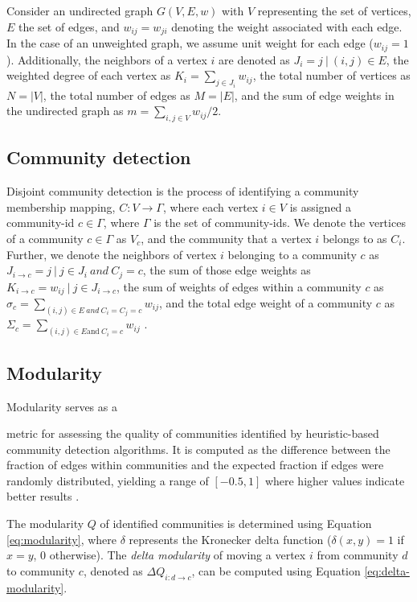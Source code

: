 Consider an undirected graph $G(V, E, w)$ with $V$ representing the set of vertices, $E$ the set of edges, and $w_{ij} = w_{ji}$ denoting the weight associated with each edge. In the case of an unweighted graph, we assume unit weight for each edge ($w_{ij} = 1$). Additionally, the neighbors of a vertex $i$ are denoted as $J_i = {j\ |\ (i, j) \in E}$, the weighted degree of each vertex as $K_i = \sum_{j \in J_i} w_{ij}$, the total number of vertices as $N = |V|$, the total number of edges as $M = |E|$, and the sum of edge weights in the undirected graph as $m = \sum_{i, j \in V} w_{ij}/2$.




\subsection{Community detection}

Disjoint community detection is the process of identifying a community membership mapping, $C: V \rightarrow \Gamma$, where each vertex $i \in V$ is assigned a community-id $c \in \Gamma$, where $\Gamma$ is the set of community-ids. We denote the vertices of a community $c \in \Gamma$ as $V_c$, and the community that a vertex $i$ belongs to as $C_i$. Further, we denote the neighbors of vertex $i$ belonging to a community $c$ as $J_{i \rightarrow c} = {j\ |\ j \in J_i\ and\ C_j = c}$, the sum of those edge weights as $K_{i \rightarrow c} = {w_{ij}\ |\ j \in J_{i \rightarrow c}}$, the sum of weights of edges within a community $c$ as $\sigma_c = \sum_{(i, j) \in E\ and\ C_i = C_j = c} w_{ij}$, and the total edge weight of a community $c$ as $\Sigma_c = \sum_{(i, j) \in E \mbox{and}\ C_i = c} w_{ij}$ \cite{com-zarayeneh21, com-leskovec21}.




\subsection{Modularity}

Modularity serves as a metric for assessing the quality of communities identified by heuristic-based community detection algorithms. It is computed as the difference between the fraction of edges within communities and the expected fraction if edges were randomly distributed, yielding a range of $[-0.5, 1]$ where higher values indicate better results \cite{com-brandes07}. The modularity $Q$ of identified communities is determined using Equation \ref{eq:modularity}, where $\delta$ represents the Kronecker delta function ($\delta (x,y)=1$ if $x=y$, $0$ otherwise). The \textit{delta modularity} of moving a vertex $i$ from community $d$ to community $c$, denoted as $\Delta Q_{i: d \rightarrow c}$, can be computed using Equation \ref{eq:delta-modularity}.

